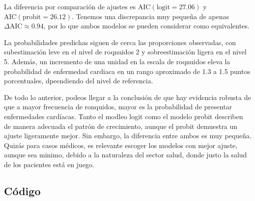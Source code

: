 La diferencia por comparación de ajustes es $\text{AIC}(\text{logit} = 27.06)$ y $\text{AIC}(\text{probit} = 26.12)$. Tenemos
una discrepancia muy pequeña de apenas $\Delta \text{AIC} \approx 0.94$, por lo que ambos modelos se 
pueden considerar como equivalentes. 

La probabilidades predichas siguen de cerca las proporciones observadas, con subestimación leve en 
el nivel de roqnuidos 2 y sobreestimación ligera en el nivel 5. Además, un incremento de una unidad
en la escala de roqnuidos eleva la probabilidad de enfermedad cardiaca en un rango aproximado de 1.3 a 1.5
puntos porcentuales, dpeendiendo del nivel de referencia. 

De todo lo anterior, podeos llegar a la conclusión de que hay evidencia robusta de que a mayor frecuencia
de ronquidos, mayor es la probabilidad de presentar enfermedades cardíacas. Tanto el modleo logit como 
el modelo probit describen de manera adecuada el patrón de crecimiento, aunque el probit demuestra un ajuste
ligeramente mejor. Sin embargo, la diferencia entre ambos es muy pequeña. Quizás para casos médicos, es 
relevante escoger los modelos con mejor ajuste, aunque sea minimo, debido a la naturaleza del sector 
salud, donde justo la salud de los pacientes está en juego. 





\subsection{Código}

